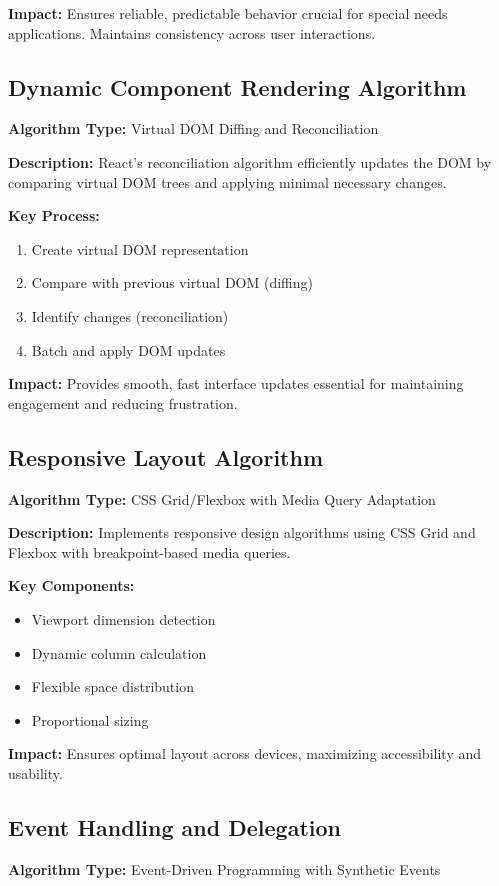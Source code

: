\documentclass[12pt,a4paper]{article}
\begin{document}
\textbf{Impact:}
Ensures reliable, predictable behavior crucial for special needs applications. Maintains consistency across user interactions.

\subsection{Dynamic Component Rendering Algorithm}
\textbf{Algorithm Type:} Virtual DOM Diffing and Reconciliation

\textbf{Description:}
React's reconciliation algorithm efficiently updates the DOM by comparing virtual DOM trees and applying minimal necessary changes.

\textbf{Key Process:}
\begin{enumerate}
    \item Create virtual DOM representation
    \item Compare with previous virtual DOM (diffing)
    \item Identify changes (reconciliation)
    \item Batch and apply DOM updates
\end{enumerate}

\textbf{Impact:}
Provides smooth, fast interface updates essential for maintaining engagement and reducing frustration.

\subsection{Responsive Layout Algorithm}
\textbf{Algorithm Type:} CSS Grid/Flexbox with Media Query Adaptation

\textbf{Description:}
Implements responsive design algorithms using CSS Grid and Flexbox with breakpoint-based media queries.

\textbf{Key Components:}
\begin{itemize}
    \item Viewport dimension detection
    \item Dynamic column calculation
    \item Flexible space distribution
    \item Proportional sizing
\end{itemize}

\textbf{Impact:}
Ensures optimal layout across devices, maximizing accessibility and usability.

\subsection{Event Handling and Delegation}
\textbf{Algorithm Type:} Event-Driven Programming with Synthetic Events
\end{document}
